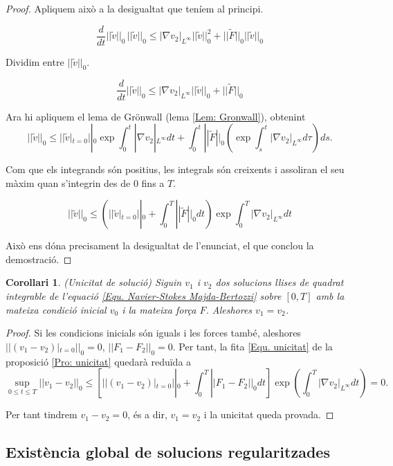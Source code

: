 \documentclass{article}
\numberwithin{equation}{section}
\newtheorem{corollari}{Corol\textperiodcentered lari}[section]
\begin{document}
\begin{proof}
Apliquem aix\`{o} a la desigualtat que ten\'{i}em al principi.

\[\frac{d}{dt}||\tilde{v}||_0\,||\tilde{v}||_0\leq|\nabla v_2|_{L^{\infty}}||\tilde{v}||_0^2+||\tilde{F}||_0||\tilde{v}||_0\]

Dividim entre $||\tilde{v}||_0$.

\[\frac{d}{dt}||\tilde{v}||_0\leq|\nabla v_2|_{L^{\infty}}||\tilde{v}||_0+||\tilde{F}||_0\]

Ara hi apliquem el lema de Gr\"{o}nwall (lema \ref{Lem: Gronwall}), obtenint
\[||\tilde{v}||_0\leq||\tilde{v}|_{t=0}||_0\exp\int_0^t|\nabla v_2|_{L^{\infty}}dt+\int_0^t||\tilde{F}||_0\left(\exp\int_s^t|\nabla v_2|_{L^{\infty}}d\tau\right)ds.\]

Com que els integrands s\'{o}n positius, les integrals s\'{o}n creixents i assoliran el seu m\`{a}xim quan s'integrin des de $0$ fins a $T$.

\[||\tilde{v}||_0\leq\left(||\tilde{v}|_{t=0}||_0+\int_0^T||\tilde{F}||_0dt\right)\exp\int_0^T|\nabla v_2|_{L^{\infty}}dt\]

Aix\`{o} ens d\'{o}na precisament la desigualtat de l'enunciat, el que conclou la demostraci\'{o}.
\end{proof}

\begin{corollari}\label{Cor: unicitat}
(Unicitat de soluci\'{o}) Siguin $v_1$ i $v_2$ dos solucions llises de quadrat integrable de l'equaci\'{o} \eqref{Equ. Navier-Stokes Majda-Bertozzi} sobre $[0,T]$ amb la mateixa condici\'{o} inicial $v_0$ i la mateixa for\c{c}a $F$. Aleshores $v_1=v_2$.
\end{corollari}
\begin{proof}
Si les condicions inicials s\'{o}n iguals i les forces tamb\'{e}, aleshores $||(v_1-v_2)|_{t=0}||_0=0$, $||F_1-F_2||_0=0$. Per tant, la fita \eqref{Equ. unicitat} de la proposici\'{o} \ref{Pro: unicitat} quedar\`{a} redu\"{i}da a
\[\sup_{0\leq t\leq T}||v_1-v_2||_0\leq\left[||(v_1-v_2)|_{t=0}||_0+\int_0^T||F_1-F_2||_0dt\right]\exp\left(\int_0^T|\nabla v_2|_{L^{\infty}}dt\right)=0.\]

Per tant tindrem $v_1-v_2=0$, \'{e}s a dir, $v_1=v_2$ i la unicitat queda provada.
\end{proof}

\subsection{Exist\`{e}ncia global de solucions regularitzades}
\end{document}
